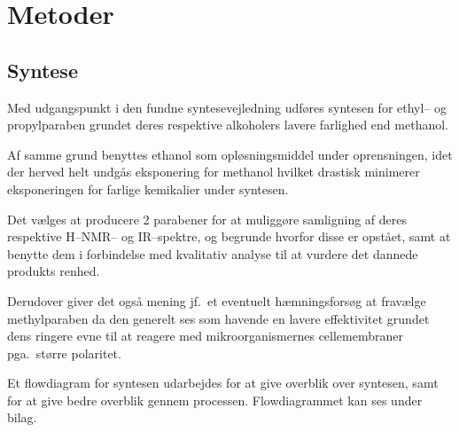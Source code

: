 \section{Metoder}
    \subsection{Syntese} 
    Med udgangspunkt i den fundne syntesevejledning \parencite{Ole2019} udføres syntesen for ethyl-- og propylparaben grundet deres respektive alkoholers lavere farlighed end methanol. 

    Af samme grund benyttes ethanol som opløsningsmiddel under oprensningen, idet der herved helt undgås eksponering for methanol hvilket drastisk minimerer eksponeringen for farlige kemikalier under syntesen.

    Det vælges at producere 2 parabener for at muliggøre samligning af deres respektive H--NMR-- og IR--spektre, og begrunde hvorfor disse er opstået, samt at benytte dem i forbindelse med kvalitativ analyse til at vurdere det dannede produkts renhed. 

    Derudover giver det også mening jf.\ et eventuelt hæmningsforsøg at fravælge methylparaben da den generelt ses som havende en lavere effektivitet grundet dens ringere evne til at reagere med mikroorganismernes cellemembraner pga.\ større polaritet.

    Et flowdiagram for syntesen udarbejdes for at give overblik over syntesen, samt for at give bedre overblik gennem processen. Flowdiagrammet kan ses under bilag.

